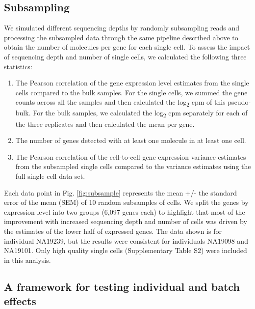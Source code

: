 \subsection{Subsampling}\label{subsampling}

We simulated different sequencing depths by randomly subsampling reads
and processing the subsampled data through the same pipeline described
above to obtain the number of molecules per gene for each single cell.
To assess the impact of sequencing depth and number of single cells, we
calculated the following three statistics:

\begin{enumerate}
\def\labelenumi{\arabic{enumi}.}
\itemsep1pt\parskip0pt
\item
  The Pearson correlation of the gene expression level estimates from
  the single cells compared to the bulk samples. For the single cells,
  we summed the gene counts across all the samples and then calculated
  the log\textsubscript{2} cpm of this pseudo-bulk. For the bulk
  samples, we calculated the log\textsubscript{2} cpm separately for
  each of the three replicates and then calculated the mean per gene.
\item
  The number of genes detected with at least one molecule in at least
  one cell.
\item
  The Pearson correlation of the cell-to-cell gene expression variance
  estimates from the subsampled single cells compared to the variance
  estimates using the full single cell data set.
\end{enumerate}

Each data point in Fig. \ref{fig:subsample} represents the mean +/- the standard error of
the mean (SEM) of 10 random subsamples of cells. We split the genes by
expression level into two groups (6,097 genes each) to highlight that
most of the improvement with increased sequencing depth and number of
cells was driven by the estimates of the lower half of expressed genes.
The data shown is for individual NA19239, but the results were
consistent for individuals NA19098 and NA19101. Only high quality single
cells (Supplementary Table S2) were included in this analysis.

\subsection{A framework for testing individual and batch
effects}\label{a-framework-for-testing-individual-and-batch-effects}

